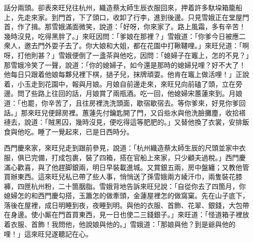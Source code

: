 話分兩頭。卻表來旺兒往杭州，織造蔡太師生辰衣服回來，押着許多馱垜箱籠船上，先走來家。到門首，下了頭口，收卸了行李，進到後邊。只見雪娥正在堂屋門首，作了揖。那雪娥滿面微笑，{}說道：「好呀，你來家了。{}路上風霜，多有辛苦！幾時沒見，吃得黑胖了。」來旺因問：「爹娘在那裡？」雪娥道：「你爹今日被應二衆人，邀去門外耍子去了。你大娘和大姐，都在花園中打鞦韆哩。」來旺兒道：「啊呀，打他則甚？」雪娥便倒了一盞茶與他吃，因問：「媳婦子在竈上，怎的不見？」那雪娥冷笑了一聲，說道：「你的媳婦子，如今還是那時的媳婦兒哩？好不大了！他每日只跟着他娘每夥兒裡下棋，撾子兒，抹牌頑耍。他肯在竈上做活哩！」正說着，小玉走到花園中，報與月娘。月娘自前邊走來，來旺兒向前磕了頭，立在旁邊。問了些路上往回的話，月娘賞了兩瓶酒。吃一回，他媳婦宋蕙蓮來到。月娘道：「也罷，你辛苦了，且往房裡洗洗頭面，歇宿歇宿去。等你爹來，好見你爹回話。」那來旺兒便歸房裡。蕙蓮先付鑰匙開了門，又舀些水與他洗臉攤塵，收拾褡褳去，說道：「賊黑囚，幾時沒見，便吃得這等肥肥的。」又替他換了衣裳，安排飯食與他吃。睡了一覺起來，已是日西時分。

西門慶來家，來旺兒走到跟前參見，說道：「杭州織造蔡太師生辰的尺頭並家中衣服，俱已完備，打成包裹，裝了四箱，搭在官船上來家，只少顧夫過稅。」西門慶滿心歡喜，與了他趕脚銀兩，明日早裝載進城。又賞銀五兩，房中盤纏；又教他管買辦東西。{}這來旺兒私已帶了些人事，悄悄送了孫雪娥兩方綾汗巾，兩隻裝花膝褲，四匣杭州粉，二十箇胭脂。{}雪娥背地告訴來旺兒說：「自從你去了四箇月，你媳婦怎的和西門慶勾搭，玉簫怎的做牽頭，金蓮屋裡怎的做窩窠。先在山子底下，落後在屋裡，成日明睡到夜，夜睡到明。與他的衣服、首飾、花翠、銀錢，大包帶在身邊。使小厮在門首買東西，見一日也使二三錢銀子。」來旺道：「怪道箱子裡放着衣服、首飾！我問他，他說娘與他的。」雪娥道：「那娘與他？到是爺與他的哩！」{}這來旺兒遂聽記在心。

